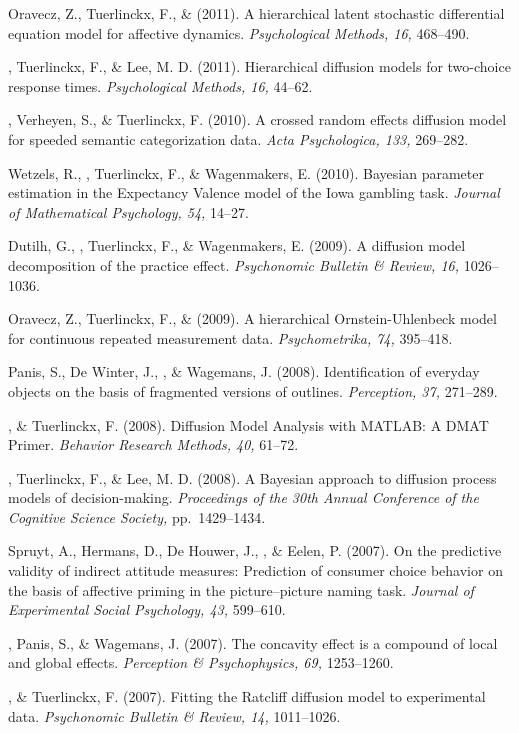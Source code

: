 \item[12.] Oravecz, Z., Tuerlinckx, F., \& \vdkh{} (2011). A hierarchical latent stochastic differential equation model for affective dynamics. {\em Psychological Methods, 16,} 468--490.
\item[11.] \vdkh{}, Tuerlinckx, F., \& Lee, M. D. (2011). Hierarchical diffusion models for two-choice response times. {\em Psychological Methods, 16,} 44--62.
\item[10.] \vdkh{}, Verheyen, S., \& Tuerlinckx, F. (2010). A crossed random effects diffusion model for speeded semantic categorization data. {\em Acta Psychologica, 133,} 269--282.
\item[9.] Wetzels, R., \vdkh{}, Tuerlinckx, F., \& Wagenmakers, E. (2010). Bayesian parameter estimation in the Expectancy Valence model of the Iowa gambling task. {\em Journal of Mathematical Psychology, 54,} 14--27.
\item[8.] Dutilh, G., \vdkh{}, Tuerlinckx, F., \& Wagenmakers, E. (2009). A diffusion model decomposition of the practice effect. {\em Psychonomic Bulletin \& Review, 16,} 1026--1036.
\item[7.] Oravecz, Z., Tuerlinckx, F., \& \vdkh{} (2009). A hierarchical Ornstein-Uhlenbeck model for continuous repeated measurement data. {\em Psychometrika, 74,} 395--418.
\item[6.] Panis, S., De Winter, J., \vdkh{}, \& Wagemans, J. (2008). Identification of everyday objects on the basis of fragmented versions of outlines. {\em Perception, 37,} 271--289.
\item[5.] \vdkh{}, \& Tuerlinckx, F. (2008). Diffusion Model Analysis with MATLAB: A DMAT Primer. {\em Behavior Research Methods, 40,} 61--72.
\item[4.] \vdkh{}, Tuerlinckx, F., \& Lee, M. D. (2008). A Bayesian approach to diffusion process models of decision-making. {\em Proceedings of the 30th Annual Conference of the Cognitive Science Society,} pp.~1429--1434.
\item[3.] Spruyt, A., Hermans, D., De Houwer, J., \vdkh{}, \& Eelen, P. (2007). On the predictive validity of indirect attitude measures: Prediction of consumer choice behavior on the basis of affective priming in the picture--picture naming task. {\em Journal of Experimental Social Psychology, 43,} 599--610.
\item[2.] \vdkh{}, Panis, S., \& Wagemans, J. (2007). The concavity effect is a compound of local and global effects. {\em Perception \& Psychophysics, 69,} 1253--1260.
\item[1.] \vdkh{}, \& Tuerlinckx, F. (2007). Fitting the Ratcliff diffusion model to experimental data. {\em Psychonomic Bulletin \& Review, 14,} 1011--1026.
\erefs

